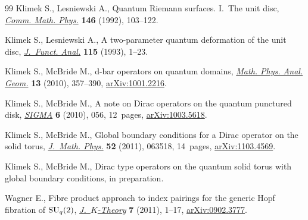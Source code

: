 \documentclass[pdftex]{sigma}
\numberwithin{equation}{section}
\begin{document}
\begin{thebibliography}{99}
Klimek S., Lesniewski A., Quantum {R}iemann surfaces. {I}.~{T}he unit disc,
  \href{http://dx.doi.org/10.1007/BF02099210}{\textit{Comm. Math. Phys.}} \textbf{146} (1992), 103--122.

Klimek S., Lesniewski A., A two-parameter quantum deformation of the unit disc,
  \href{http://dx.doi.org/10.1006/jfan.1993.1078}{\textit{J.~Funct. Anal.}} \textbf{115} (1993), 1--23.

Klimek S., McBride M., d-bar operators on quantum domains, \href{http://dx.doi.org/10.1007/s11040-010-9084-9}{\textit{Math. Phys.
  Anal. Geom.}} \textbf{13} (2010), 357--390, \href{http://arxiv.org/abs/1001.2216}{arXiv:1001.2216}.

Klimek S., McBride M., A note on {D}irac operators on the quantum punctured
  disk, \href{http://dx.doi.org/10.3842/SIGMA.2010.056}{\textit{SIGMA}} \textbf{6} (2010), 056, 12~pages, \href{http://arxiv.org/abs/1003.5618}{arXiv:1003.5618}.

Klimek S., McBride M., Global boundary conditions for a {D}irac operator on the
  solid torus, \href{http://dx.doi.org/10.1063/1.3602276}{\textit{J.~Math. Phys.}} \textbf{52} (2011), 063518, 14~pages,
  \href{http://arxiv.org/abs/1103.4569}{arXiv:1103.4569}.

Klimek S., McBride M., Dirac type operators on the quantum solid torus with
  global boundary conditions, {i}n preparation.

Wagner E., Fibre product approach to index pairings for the generic {H}opf
  f\/ibration of {${\rm SU}_q(2)$}, \href{http://dx.doi.org/10.1017/is010002019jkt110}{\textit{J.~$K$-Theory}} \textbf{7} (2011),
  1--17, \href{http://arxiv.org/abs/0902.3777}{arXiv:0902.3777}.

\end{thebibliography}\LastPageEnding
\end{document}
